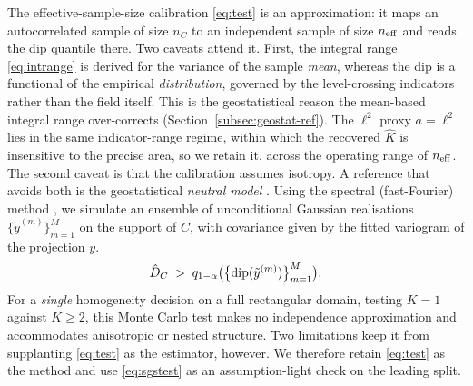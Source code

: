 The effective-sample-size calibration \eqref{eq:test} is an approximation: it
maps an autocorrelated sample of size $n_C$ to an independent sample of size
$n_{\mathrm{eff}}$ and reads the dip quantile there. Two caveats attend it. First, the
integral range \eqref{eq:intrange} is derived for the variance of the sample
\emph{mean}, whereas the dip is a functional of the empirical
\emph{distribution}, governed by the level-crossing indicators rather than the
field itself.  This is the geostatistical
reason the mean-based integral range over-corrects
(Section~\ref{subsec:geostat-ref}). The $\ell^{2}$ proxy $a=\ell^2$ lies in the same
indicator-range regime, within which the recovered $\hat K$ is insensitive to
the precise area, so we retain it.  across the operating range of $n_{\mathrm{eff}}$. The second caveat is that the calibration assumes isotropy. A reference that avoids both is the
geostatistical \emph{neutral model} \citep{Goovaerts2004}. Using the
spectral (fast-Fourier) method \citep{DietrichNewsam1993,Lantuejoul2002},
we simulate an ensemble of unconditional Gaussian realisations
$\{\tilde y^{(m)}\}_{m=1}^{M}$ on the support of $C$, with covariance given
by the fitted variogram of the projection $y$. 
\begin{equation}\label{eq:sgstest}
  \hat D_C \;>\; q_{1-\alpha}\bigl(\bigl\{\mathrm{dip}(\tilde y^{(m)})\bigr\}_{m=1}^{M}\bigr).
\end{equation}
For a \emph{single} homogeneity decision on a full rectangular domain,
testing $K=1$ against $K\ge2$, this Monte Carlo test makes no independence
approximation and accommodates anisotropic or nested structure.
 Two
limitations keep it from supplanting \eqref{eq:test} as the estimator, however.
 We therefore retain
\eqref{eq:test} as the method and use \eqref{eq:sgstest} as an
assumption-light check on the leading split.

